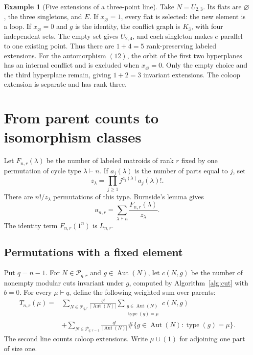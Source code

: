 \documentclass[11pt]{article}
\theoremstyle{definition}
\newtheorem{example}[theorem]{Example}
\DeclareMathOperator{\Aut}{Aut}
\DeclareMathOperator{\type}{type}
\newcommand{\Part}{\mathcal P}
\begin{document}
\begin{example}[Five extensions of a three-point line]\label{ex:line}
Take $N=U_{2,3}$. Its flats are $\varnothing$, the three singletons, and $E$.
If $x_{\varnothing}=1$, every flat is selected: the new element is a loop.
If $x_{\varnothing}=0$ and $g$ is the identity, the conflict graph is $K_3$, with four independent
sets. The empty set gives $U_{2,4}$, and each singleton makes $e$ parallel
to one existing point. Thus there are $1+4=5$ rank-preserving labeled
extensions. For the automorphism $(12)$, the orbit of the first two
hyperplanes has an internal conflict and is excluded when $x_{\varnothing}=0$.
Only the empty choice and the third hyperplane remain, giving $1+2=3$
invariant extensions. The coloop extension is separate and has rank three.
\end{example}

\section{From parent counts to isomorphism classes}\label{sec:symmetry}

Let $F_{n,r}(\lambda)$ be the number of labeled matroids of rank $r$ fixed by
one permutation of cycle type $\lambda\vdash n$. If $a_j(\lambda)$ is the
number of parts equal to $j$, set
\[
z_\lambda=\prod_{j\ge1}j^{a_j(\lambda)}a_j(\lambda)!.
\]
There are $n!/z_\lambda$ permutations of this type. Burnside's lemma gives
\begin{equation}\label{eq:burnside}
u_{n,r}=\sum_{\lambda\vdash n}\frac{F_{n,r}(\lambda)}{z_\lambda}.
\end{equation}
The identity term $F_{n,r}(1^n)$ is $L_{n,r}$.

\subsection{Permutations with a fixed element}

Put $q=n-1$. For $N\in\Part_{q,r}$ and $g\in\Aut(N)$, let $c(N,g)$ be
the number of nonempty modular cuts invariant under $g$, computed by
Algorithm~\ref{alg:cut} with $b=0$. For every $\mu\vdash q$, define the
following weighted sum over parents:
\begin{equation}\label{eq:parent-sum}
\begin{split}
T_{n,r}(\mu)={}&
\sum_{N\in\Part_{q,r}}\frac{q!}{|\Aut(N)|}
 \sum_{\substack{g\in\Aut(N)\\\type(g)=\mu}}c(N,g)\\
&+\sum_{N\in\Part_{q,r-1}}\frac{q!}{|\Aut(N)|}
 \#\{g\in\Aut(N):\type(g)=\mu\}.
\end{split}
\end{equation}
The second line counts coloop extensions. Write $\mu\cup(1)$ for adjoining
one part of size one.
\end{document}
